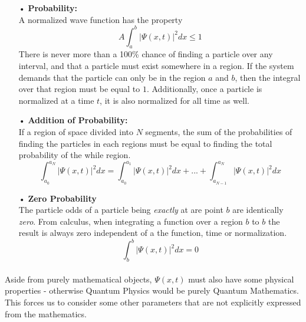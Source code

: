 \documentclass[12pt,letterpaper]{book}
\begin{document}
\begin{enumerate}
\item[•]\textbf{Probability:}\\
A normalized wave function has the property
\begin{equation}
A\int_{a}^{b} \big | \Psi(x,t) \big|^2 dx \leq 1
\end{equation}
There is never more than a 100\% chance of finding a particle over any interval, and that a particle must exist somewhere in a region. If the system demands that the particle can only be in the region $a$ and $b$, then the integral over that region must be equal to $1$. Additionally, once a particle is normalized at a time $t$, it is also normalized for all time as well.
\item[•]\textbf{Addition of Probability:}\\
If a region of space divided into $N$ segments, the sum of the probabilities of finding the particles in each regions must be equal to finding the total probability of the while region.
\begin{equation}
\int_{a_0}^{a_N} \big | \Psi(x,t) \big|^2 dx =
\int_{a_0}^{a_1} \big | \Psi(x,t) \big|^2 dx + ... +
\int_{a_{N-1}}^{a_N} \big | \Psi(x,t) \big|^2 dx
\end{equation}
\item[•]\textbf{Zero Probability}\\
The particle odds of a particle being \textit{exactly} at are point $b$ are identically \textit{zero}. From calculus, when integrating a function over a region $b$ to $b$ the result is always zero independent of a the function, time or normalization. 
\begin{equation}
\int_{b}^{b} \big | \Psi(x,t) \big|^2 dx = 0
\end{equation}
\end{enumerate}
\paragraph*{}Aside from purely mathematical objects, $\Psi(x,t)$ must also have some physical properties - otherwise Quantum Physics would be purely Quantum Mathematics. This forces us to consider some other parameters that are not explicitly expressed from the mathematics.
\end{document}

